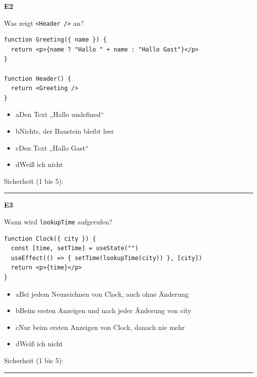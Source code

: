 \medskip

\noindent\begin{minipage}{\linewidth}
\textbf{E2}\par
Was zeigt \texttt{<Header /\allowbreak{}>} an?

{\small
\begin{verbatim}
function Greeting({ name }) {
  return <p>{name ? "Hallo " + name : "Hallo Gast"}</p>
}

function Header() {
  return <Greeting />
}
\end{verbatim}
}
\begin{itemize}[nosep,leftmargin=2.4em]
\item[\kreuz] a\quad Den Text „Hallo undefined“
\item[\kreuz] b\quad Nichts, der Baustein bleibt leer
\item[\kreuz] c\quad Den Text „Hallo Gast“
\item[\kreuz] d\quad Weiß ich nicht
\end{itemize}
\noindent Sicherheit (1 bis 5):~\rule{2.5em}{0.4pt}\par
\end{minipage}

\medskip

\noindent\begin{minipage}{\linewidth}
\textbf{E3}\par
Wann wird \texttt{lookupTime} aufgerufen?

{\small
\begin{verbatim}
function Clock({ city }) {
  const [time, setTime] = useState("")
  useEffect(() => { setTime(lookupTime(city)) }, [city])
  return <p>{time}</p>
}
\end{verbatim}
}
\begin{itemize}[nosep,leftmargin=2.4em]
\item[\kreuz] a\quad Bei jedem Neuzeichnen von Clock, auch ohne Änderung
\item[\kreuz] b\quad Beim ersten Anzeigen und nach jeder Änderung von city
\item[\kreuz] c\quad Nur beim ersten Anzeigen von Clock, danach nie mehr
\item[\kreuz] d\quad Weiß ich nicht
\end{itemize}
\noindent Sicherheit (1 bis 5):~\rule{2.5em}{0.4pt}\par
\end{minipage}

\medskip

